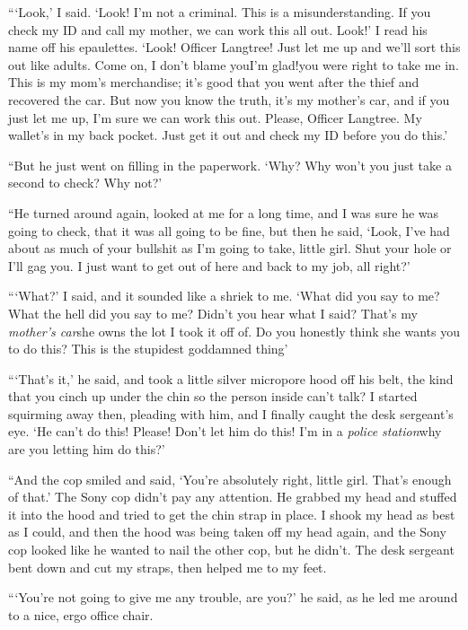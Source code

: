 “‘Look,’ I said. ‘Look! I’m not a criminal. This is a
misunderstanding. If you check my ID and call my mother, we can
work this all out. Look!’ I read his name off his epaulettes.
‘Look! Officer Langtree! Just let me up and we’ll sort this out
like adults. Come on, I don’t blame you{\dash}I’m glad!{\dash}you were right to
take me in. This is my mom’s merchandise; it’s good that you went
after the thief and recovered the car. But now you know the truth,
it’s my mother’s car, and if you just let me up, I’m sure we can
work this out. Please, Officer Langtree. My wallet’s in my back
pocket. Just get it out and check my ID before you do this.’

“But he just went on filling in the paperwork. ‘Why? Why won’t you
just take a second to check? Why not?’

“He turned around again, looked at me for a long time, and I was
sure he was going to check, that it was all going to be fine, but
then he said, ‘Look, I’ve had about as much of your bullshit as I’m
going to take, little girl. Shut your hole or I’ll gag you. I just
want to get out of here and back to my job, all right?’

“‘What?’ I said, and it sounded like a shriek to me. ‘What did you
say to me? What the hell did you say to me? Didn’t you hear what I
said? That’s my \emph{mother’s car}{\dash}she owns the lot I took it off
of. Do you honestly think she wants you to do this? This is the
stupidest goddamned thing{\dash}’

“‘That’s it,’ he said, and took a little silver micropore hood off
his belt, the kind that you cinch up under the chin so the person
inside can’t talk? I started squirming away then, pleading with
him, and I finally caught the desk sergeant’s eye. ‘He can’t do
this! Please! Don’t let him do this! I’m in a
\emph{police station}{\dash}why are you letting him do this?’

“And the cop smiled and said, ‘You’re absolutely right, little
girl. That’s enough of that.’ The Sony cop didn’t pay any
attention. He grabbed my head and stuffed it into the hood and
tried to get the chin strap in place. I shook my head as best as I
could, and then the hood was being taken off my head again, and the
Sony cop looked like he wanted to nail the other cop, but he
didn’t. The desk sergeant bent down and cut my straps, then helped
me to my feet.

“‘You’re not going to give me any trouble, are you?’ he said, as he
led me around to a nice, ergo office chair.

